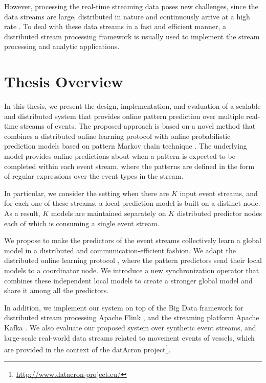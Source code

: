 \par However, processing the real-time streaming data poses new challenges, since the data streams are large, distributed in nature and continuously arrive at a high rate \cite{Babcock2002,Flouris2017}. To deal with these data streams in a fast and efficient manner, a distributed stream processing framework \cite{Spark,Flink,Storm} is usually used to implement the stream processing and analytic applications. 


\section{Thesis Overview}
\par In this thesis, we present the design, implementation, and evaluation of a scalable and distributed system that provides online pattern prediction over multiple real-time streams of events. The proposed approach is based on a novel method that combines a distributed online learning protocol \cite{kamp2014communication} with online probabilistic prediction models based on pattern Markov chain technique \cite{alevizos2017event}. The underlying model provides online predictions about when a pattern is expected to be completed within each event stream, where the patterns are defined in the form of regular expressions over the event types in the stream.

\par In particular, we consider the setting when there are \emph{$K$} input event streams, and for each one of these streams, a local prediction model is built on a distinct node. As a result, \emph{$K$} models are maintained separately on \emph{$K$} distributed predictor nodes each of which is consuming a single event stream.


 \par We propose to make the predictors of the event streams collectively learn a global model in a distributed and communication-efficient fashion. We adapt the distributed online learning protocol \cite{kamp2014communication}, where the pattern predictors \cite{alevizos2017event} send their local models to a coordinator node. We introduce a new synchronization operator that combines these independent local models to create a stronger global model and share it among all the predictors.
  

\par In addition, we  implement our system on top of the Big Data framework for distributed stream processing Apache Flink \cite{Flink}, and the streaming platform Apache Kafka \cite{Kafka}. We also evaluate our proposed system over synthetic event streams, and large-scale real-world data streams related to movement events of vessels, which are provided in the context of the datAcron project\footnote{\url{http://www.datacron-project.eu/}}.

